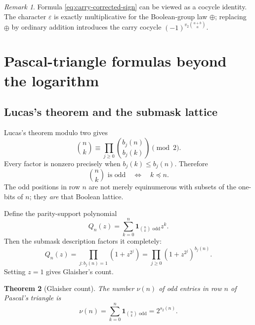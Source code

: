 \documentclass[11pt,oneside]{article}
\newtheorem{theorem}{Theorem}[section]
\theoremstyle{definition}
\theoremstyle{remark}
\newtheorem{remark}[theorem]{Remark}
\newcommand{\vtwo}{v_2}
\newcommand{\bitsum}{s_2}
\newcommand{\eps}{\varepsilon}
\newcommand{\ind}{\mathbf 1}
\newcommand{\xor}{\mathbin{\oplus}}
\newcommand{\submask}{\preccurlyeq}
\begin{document}
\begin{remark}
Formula \eqref{eq:carry-corrected-sign} can be viewed as a cocycle identity.
The character \(\eps\) is exactly multiplicative for the Boolean-group law
\(\xor\); replacing \(\xor\) by ordinary addition introduces the carry
cocycle \((-1)^{\vtwo\binom{a+b}{a}}\).
\end{remark}

\section{Pascal-triangle formulas beyond the logarithm}
\label{sec:pascal}

\subsection{Lucas's theorem and the submask lattice}

Lucas's theorem modulo two gives
\begin{equation}
  \binom{n}{k}\equiv
  \prod_{j\ge0}\binom{b_j(n)}{b_j(k)}\pmod2.
  \label{eq:lucas-binary}
\end{equation}
Every factor is nonzero precisely when \(b_j(k)\le b_j(n)\).  Therefore
\begin{equation}
  \binom{n}{k}\text{ is odd}
  \quad\Longleftrightarrow\quad
  k\submask n.
  \label{eq:odd-submask}
\end{equation}
The odd positions in row \(n\) are not merely equinumerous with subsets of
the one-bits of \(n\); they \emph{are} that Boolean lattice.

Define the parity-support polynomial
\begin{equation}
  Q_n(z)=\sum_{k=0}^{n}
    \ind_{\binom nk\text{ odd}}z^k.
  \label{eq:row-support-polynomial}
\end{equation}
Then the submask description factors it completely:
\begin{equation}
  Q_n(z)=\prod_{j:b_j(n)=1}(1+z^{2^j})
        =\prod_{j\ge0}(1+z^{2^j})^{b_j(n)}.
  \label{eq:row-support-factorization}
\end{equation}
Setting \(z=1\) gives Glaisher's count.

\begin{theorem}[Glaisher count]
The number \(\nu(n)\) of odd entries in row \(n\) of Pascal's triangle is
\begin{equation}
  \nu(n)=\sum_{k=0}^{n}\ind_{\binom nk\text{ odd}}
        =2^{\bitsum(n)}.
  \label{eq:glaisher-count}
\end{equation}
\end{theorem}
\end{document}
